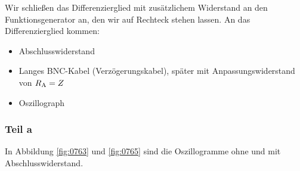 Wir schließen das Differenzierglied mit zusätzlichem Widerstand an den
Funktionsgenerator an, den wir auf Rechteck stehen lassen. An das
Differenzierglied kommen:
%
\begin{itemize}
	\item
		Abschlusswiderstand
	\item
		Langes BNC-Kabel (Verzögerungskabel), später mit Anpassungswiderstand
		von $R_\text A = Z$
	\item
		Oszillograph
\end{itemize}

\FloatBarrier
\subsubsection{Teil a}

In Abbildung \ref{fig:0763} und \ref{fig:0765} sind die Oszillogramme ohne und
mit Abschlusswiderstand.

